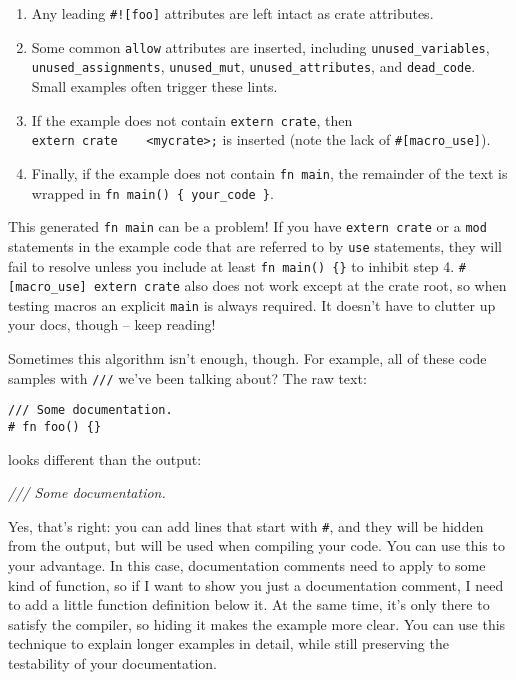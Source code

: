 \documentclass[a4paper,]{book}
\newenvironment{Shaded}{\begin{snugshade}}{\end{snugshade}}
\newcommand{\CommentTok}[1]{\textcolor[rgb]{0.56,0.35,0.01}{\textit{{#1}}}}
\providecommand{\tightlist}{%
  \setlength{\itemsep}{0pt}\setlength{\parskip}{0pt}}
\begin{document}
\begin{enumerate}
\def\labelenumi{\arabic{enumi}.}
\tightlist
\item
  Any leading \texttt{\#!{[}foo{]}} attributes are left intact as crate
  attributes.
\item
  Some common \texttt{allow} attributes are inserted, including
  \texttt{unused\_variables}, \texttt{unused\_assignments},
  \texttt{unused\_mut}, \texttt{unused\_attributes}, and
  \texttt{dead\_code}. Small examples often trigger these lints.
\item
  If the example does not contain \texttt{extern\ crate}, then
  \texttt{extern\ crate\ \ \ \ \textless{}mycrate\textgreater{};} is
  inserted (note the lack of \texttt{\#{[}macro\_use{]}}).
\item
  Finally, if the example does not contain \texttt{fn\ main}, the
  remainder of the text is wrapped in
  \texttt{fn\ main()\ \{\ your\_code\ \}}.
\end{enumerate}

This generated \texttt{fn\ main} can be a problem! If you have
\texttt{extern\ crate} or a \texttt{mod} statements in the example code
that are referred to by \texttt{use} statements, they will fail to
resolve unless you include at least \texttt{fn\ main()\ \{\}} to inhibit
step 4. \texttt{\#{[}macro\_use{]}\ extern\ crate} also does not work
except at the crate root, so when testing macros an explicit
\texttt{main} is always required. It doesn't have to clutter up your
docs, though -- keep reading!

Sometimes this algorithm isn't enough, though. For example, all of these
code samples with \texttt{///} we've been talking about? The raw text:

\begin{verbatim}
/// Some documentation.
# fn foo() {}
\end{verbatim}

looks different than the output:

\begin{Shaded}
\begin{Highlighting}[]
\CommentTok{/// Some documentation.}
\end{Highlighting}
\end{Shaded}

Yes, that's right: you can add lines that start with \texttt{\#}, and
they will be hidden from the output, but will be used when compiling
your code. You can use this to your advantage. In this case,
documentation comments need to apply to some kind of function, so if I
want to show you just a documentation comment, I need to add a little
function definition below it. At the same time, it's only there to
satisfy the compiler, so hiding it makes the example more clear. You can
use this technique to explain longer examples in detail, while still
preserving the testability of your documentation.
\end{document}
